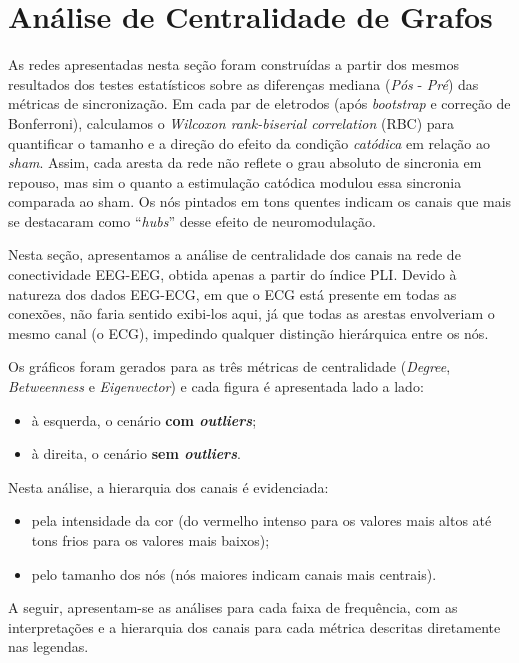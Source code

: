 \chapter{Análise de Centralidade de Grafos}
\label{chap:analise_centralidade_de_grafos}
As redes apresentadas nesta seção foram construídas a partir dos mesmos resultados dos testes estatísticos sobre as diferenças mediana (\emph{Pós} - \emph{Pré}) das métricas de sincronização. Em cada par de eletrodos (após \textit{bootstrap} e correção de Bonferroni), calculamos o \emph{Wilcoxon rank-biserial correlation} (RBC) para quantificar o tamanho e a direção do efeito da condição \emph{catódica} em relação ao \emph{sham}. Assim, cada aresta da rede não reflete o grau absoluto de sincronia em repouso, mas sim o quanto a estimulação catódica modulou essa sincronia comparada ao sham. Os nós pintados em tons quentes indicam os canais que mais se destacaram como ``\textit{hubs}'' desse efeito de neuromodulação.

Nesta seção, apresentamos a análise de centralidade dos canais na rede de conectividade EEG-EEG, obtida apenas a partir do índice PLI. Devido à natureza dos dados EEG-ECG, em que o ECG está presente em todas as conexões, não faria sentido exibi-los aqui, já que todas as arestas envolveriam o mesmo canal (o ECG), impedindo qualquer distinção hierárquica entre os nós.

Os gráficos foram gerados para as três métricas de centralidade (\textit{Degree}, \textit{Betweenness} e \textit{Eigenvector}) e cada figura é apresentada lado a lado:
\begin{itemize}
  \item à esquerda, o cenário \textbf{com \emph{outliers}};
  \item à direita, o cenário \textbf{sem \emph{outliers}}.
\end{itemize}

Nesta análise, a hierarquia dos canais é evidenciada:
\begin{itemize}
  \item pela intensidade da cor (do vermelho intenso para os valores mais altos até tons frios para os valores mais baixos);
  \item pelo tamanho dos nós (nós maiores indicam canais mais centrais).
\end{itemize}

A seguir, apresentam-se as análises para cada faixa de frequência, com as interpretações e a hierarquia dos canais para cada métrica descritas diretamente nas legendas.

